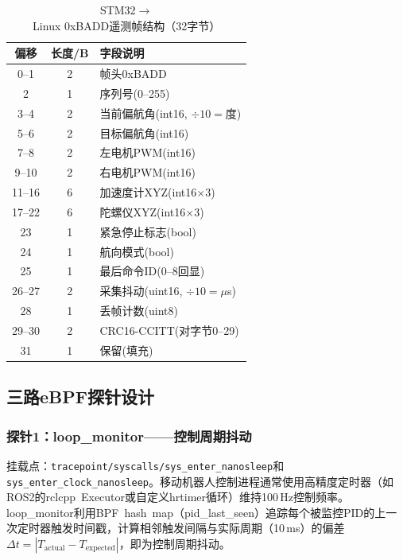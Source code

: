 \documentclass{rjthesis}
\begin{document}
\begin{table}[t]
    \centering
    \caption{STM32$\to$Linux 0xBADD遥测帧结构（32字节）}
    \label{tab:badd}
    \small
    \begin{tabular}{c c l}
        \toprule
        偏移 & 长度/B & 字段说明 \\
        \midrule
        0--1  & 2  & 帧头0xBADD \\
        2     & 1  & 序列号(0--255) \\
        3--4  & 2  & 当前偏航角(int16, $\div10=\text{度}$) \\
        5--6  & 2  & 目标偏航角(int16) \\
        7--8  & 2  & 左电机PWM(int16) \\
        9--10 & 2  & 右电机PWM(int16) \\
        11--16& 6  & 加速度计XYZ(int16$\times$3) \\
        17--22& 6  & 陀螺仪XYZ(int16$\times$3) \\
        23    & 1  & 紧急停止标志(bool) \\
        24    & 1  & 航向模式(bool) \\
        25    & 1  & 最后命令ID(0--8回显) \\
        26--27& 2  & 采集抖动(uint16, $\div10=\mu$s) \\
        28    & 1  & 丢帧计数(uint8) \\
        29--30& 2  & CRC16-CCITT(对字节0--29) \\
        31    & 1  & 保留(填充) \\
        \bottomrule
    \end{tabular}
\end{table}

\subsection{三路eBPF探针设计}

\subsubsection{探针1：loop\_monitor——控制周期抖动}

挂载点：\texttt{tracepoint/syscalls/sys\_enter\_nanosleep}和\texttt{sys\_enter\_clock\_nanosleep}。移动机器人控制进程通常使用高精度定时器（如ROS2的rclcpp~Executor或自定义hrtimer循环）维持100\,Hz控制频率。loop\_monitor利用BPF~hash~map（pid\_last\_seen）追踪每个被监控PID的上一次定时器触发时间戳，计算相邻触发间隔与实际周期（10\,ms）的偏差$\Delta t = |T_{\text{actual}} - T_{\text{expected}}|$，即为控制周期抖动。
\end{document}
